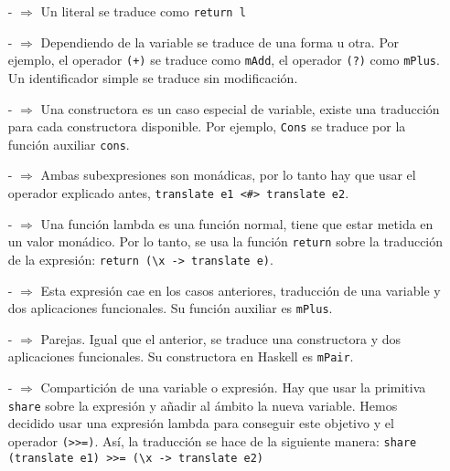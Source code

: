 \documentclass[class=article, crop=false]{standalone}
\begin{document}
\begin{itemize}
  \item[-]{} $\Rightarrow$ Un literal se traduce como
  \verb`return l`
  
  \item[-]{} $\Rightarrow$ Dependiendo de la variable se traduce de
  una forma u otra. Por ejemplo, el operador \verb`(+)` se traduce como \verb`mAdd`, el
  operador \verb`(?)` como \verb`mPlus`. Un identificador simple se traduce sin modificación.
  
  \item[-]{} $\Rightarrow$ Una constructora es un caso especial de
  variable, existe una traducción para cada constructora disponible. Por ejemplo, \verb`Cons`
  se traduce por la función auxiliar \verb`cons`.

  \item[-]{} $\Rightarrow$ Ambas subexpresiones son
  monádicas, por lo tanto hay que usar el operador explicado antes,
  \verb`translate e1 <#> translate e2`.

  \item[-]{} $\Rightarrow$ Una función
  lambda es una función normal, tiene que estar metida en un valor monádico. Por lo tanto, se
  usa la función \verb`return` sobre la traducción de la expresión:
  \verb`return (\x -> translate e)`.

  \item[-]{}  $\Rightarrow$ Esta expresión cae en los
  casos anteriores, traducción de una variable y dos aplicaciones funcionales. Su función
  auxiliar es \verb`mPlus`.

  \item[-]{} $\Rightarrow$ Parejas. Igual que el
  anterior, se traduce una constructora y dos aplicaciones funcionales. Su constructora en
  Haskell es \verb`mPair`.

  \item[-]{} $\Rightarrow$ Compartición
  de una variable o expresión. Hay que usar la primitiva \verb`share` sobre la expresión y
  añadir al ámbito la nueva variable. Hemos decidido usar una expresión lambda para conseguir
  este objetivo y el operador \verb`(>>=)`. Así, la traducción se hace de la siguiente
  manera: \verb`share (translate e1) >>= (\x -> translate e2)`


\end{itemize}
\end{document}
